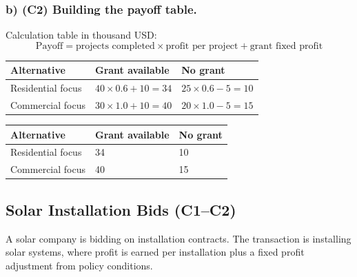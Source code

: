 	
	\subsubsection*{b) \textbf{(C2)} Building the payoff table.}
	\label{subsec:problem19-urban-landscaping-bids-c2}
	Calculation table in thousand USD:
	\[
	\text{Payoff}=\text{projects completed}\times\text{profit per project}+\text{grant fixed profit}
	\]
	\begin{center}
		\begin{tabular}{lll}
			\toprule
			Alternative & Grant available & No grant \\
			\midrule
			Residential focus & $40 \times 0.6 + 10 = 34$ & $25 \times 0.6 - 5 = 10$ \\
			Commercial focus & $30 \times 1.0 + 10 = 40$ & $20 \times 1.0 - 5 = 15$ \\
			\bottomrule
		\end{tabular}
	\end{center}
	
	\begin{center}
		\begin{tabular}{lll}
			\toprule
			Alternative & Grant available & No grant \\
			\midrule
			Residential focus & 34 & 10 \\
			Commercial focus & 40 & 15 \\
			\bottomrule
		\end{tabular}
	\end{center}
	
	
	\subsection{Solar Installation Bids (C1--C2)}
	\label{sec:problem12-solar-installation-bids-c1-c2}
	A solar company is bidding on installation contracts. The transaction is installing solar systems, where profit is earned per installation plus a fixed profit adjustment from policy conditions.
	
